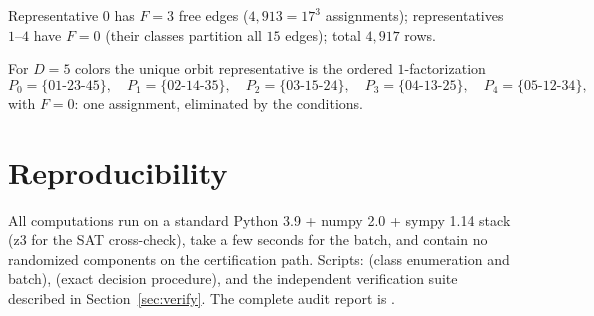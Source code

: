 \documentclass[11pt]{article}
\theoremstyle{definition}
\begin{document}
\begin{center}
\end{center}

Representative $0$ has $F=3$ free edges ($4{,}913=17^3$ assignments);
representatives $1$--$4$ have $F=0$ (their classes partition all
$15$ edges); total $4{,}917$ rows.

For $D=5$ colors the unique orbit representative is the ordered
$1$-factorization
\[
P_0=\{01\text{-}23\text{-}45\},\quad
P_1=\{02\text{-}14\text{-}35\},\quad
P_2=\{03\text{-}15\text{-}24\},\quad
P_3=\{04\text{-}13\text{-}25\},\quad
P_4=\{05\text{-}12\text{-}34\},
\]
with $F=0$: one assignment, eliminated by the conditions.

\section{Reproducibility}\label{app:repro}

All computations run on a standard Python 3.9 + numpy 2.0 + sympy 1.14
stack (z3 for the SAT cross-check), take a few seconds for the batch,
and contain no randomized components on the certification path.
Scripts:  (class enumeration and
batch),  (exact decision procedure),
and the independent verification suite
 described in
Section~\ref{sec:verify}. The complete audit report is
.
\end{document}
